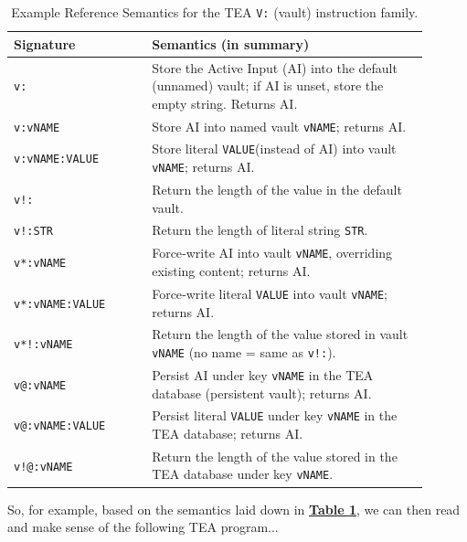 \documentclass[sigplan,screen]{acmart}
\begin{document}
\begin{table}[ht]
  \centering
  \small
  \caption{Example Reference Semantics for the TEA \texttt{V:} (vault) instruction family.}
  \label{tab:tea-v-semantics}
  \begin{tabular}{@{}p{0.3\linewidth} p{0.6\linewidth}@{}}
    \toprule
    \textbf{Signature} & \textbf{Semantics (in summary)} \\
    \midrule
    \texttt{v:} & Store the Active Input (AI) into the default (unnamed) vault; if AI is unset, store the empty string. Returns AI. \\
    \hline
    \texttt{v:vNAME} & Store AI into named vault \texttt{vNAME}; returns AI. \\
     \hline
    \texttt{v:vNAME:VALUE} & Store literal \texttt{VALUE}(instead of AI) into vault \texttt{vNAME}; returns AI. \\
     \hline
    \texttt{v!:} & Return the length of the value in the default vault. \\
     \hline
    \texttt{v!:STR} & Return the length of literal string \texttt{STR}. \\
     \hline
    \texttt{v*:vNAME} & Force‑write AI into vault \texttt{vNAME}, overriding existing content; returns AI. \\
     \hline
    \texttt{v*:vNAME:VALUE} & Force‑write literal \texttt{VALUE} into vault \texttt{vNAME}; returns AI. \\
     \hline
    \texttt{v*!:vNAME} & Return the length of the value stored in vault \texttt{vNAME} (no name = same as \texttt{v!:}). \\
     \hline
    \texttt{v@:vNAME} & Persist AI under key \texttt{vNAME} in the TEA database (persistent vault); returns AI. \\
     \hline
    \texttt{v@:vNAME:VALUE} & Persist literal \texttt{VALUE} under key \texttt{vNAME} in the TEA database; returns AI. \\
     \hline
    \texttt{v!@:vNAME} & Return the length of the value stored in the TEA database under key \texttt{vNAME}. \\
    \bottomrule
  \end{tabular}
\end{table}

 So, for example, based on the semantics laid down in \textbf{\hyperref[tab:tea-v-semantics]{Table \ref{tab:tea-v-semantics}}}, we can then read and make sense of the following TEA program...
 
\end{document}
